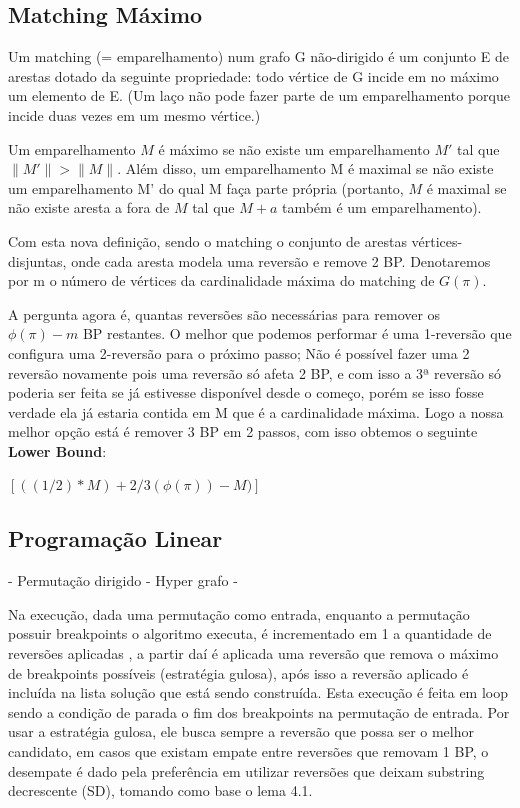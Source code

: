 \subsection{Matching Máximo}
Um matching (= emparelhamento) num grafo G não-dirigido é um conjunto E de arestas dotado da seguinte propriedade: todo vértice de G incide em no máximo um elemento de E.  (Um laço não pode fazer parte de um emparelhamento porque incide duas vezes em um mesmo vértice.)

Um emparelhamento $M$ é máximo se não existe um emparelhamento $M'$ tal que $\|M'\| > \|M\|$.  Além disso, um emparelhamento M é maximal se não existe um emparelhamento M' do qual M faça parte própria (portanto, $M$ é maximal se não existe aresta a fora de $M$ tal que $M+{a}$ também é um emparelhamento).

Com esta nova definição, sendo o matching o conjunto de arestas vértices-disjuntas, onde cada aresta modela uma reversão e remove 2 BP. Denotaremos por m o número de vértices da cardinalidade máxima do matching de $G(\pi)$.

A pergunta agora é, quantas reversões são necessárias para remover os $\phi(\pi) - m$ BP restantes. O melhor que podemos performar é uma 1-reversão que configura uma 2-reversão para o próximo passo; Não é possível fazer uma 2 reversão novamente pois uma reversão só afeta 2 BP, e com isso a 3ª reversão só poderia ser feita se já estivesse disponível desde o começo, porém se isso fosse verdade ela já estaria contida em M que é a cardinalidade máxima. Logo a nossa melhor opção está é remover 3 BP em 2 passos, com isso obtemos o seguinte \textbf{Lower Bound}:
    
\begin{center}
$[((1/2) * M) + 2/3 (\phi(\pi)) - M)]$    
\end{center}












\subsection{Programação Linear}
- Permutação dirigido
- Hyper grafo
- 


Na execução, dada uma permutação como entrada, enquanto a permutação possuir breakpoints o algoritmo executa, é incrementado em 1 a quantidade de reversões aplicadas , a partir daí é aplicada uma reversão que remova o máximo de breakpoints possíveis (estratégia gulosa), após isso a reversão aplicado é incluída na lista solução que está sendo construída. Esta execução é feita em loop sendo a condição de parada o fim dos breakpoints na permutação de entrada. Por usar a estratégia gulosa, ele busca sempre a reversão que possa ser o melhor candidato, em casos que existam empate entre reversões que removam 1 BP, o desempate é dado pela preferência em utilizar reversões que deixam substring decrescente (SD), tomando como base o  lema 4.1.\\


